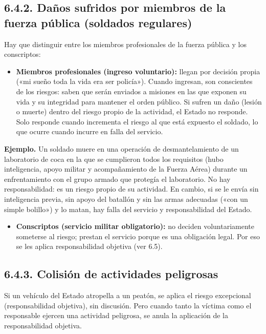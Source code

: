 \subsection{6.4.2. Daños sufridos por miembros de la fuerza pública (soldados regulares)}
Hay que distinguir entre los miembros profesionales de la fuerza pública y los conscriptos:

\begin{itemize}
\item \textbf{Miembros profesionales (ingreso voluntario):} llegan por decisión propia («mi sueño toda la vida era ser policía»). Cuando ingresan, son conscientes de los riesgos: saben que serán enviados a misiones en las que exponen su vida y su integridad para mantener el orden público. Si sufren un daño (lesión o muerte) dentro del riesgo propio de la actividad, el Estado no responde. Solo responde cuando incrementa el riesgo al que está expuesto el soldado, lo que ocurre cuando incurre en falla del servicio.
\end{itemize}
\begin{ejemplo}
\textcolor[HTML]{4F6228}{\textbf{Ejemplo. }}Un soldado muere en una operación de desmantelamiento de un laboratorio de coca en la que se cumplieron todos los requisitos (hubo inteligencia, apoyo militar y acompañamiento de la Fuerza Aérea) durante un enfrentamiento con el grupo armado que protegía el laboratorio. No hay responsabilidad: es un riesgo propio de su actividad. En cambio, si se le envía sin inteligencia previa, sin apoyo del batallón y sin las armas adecuadas («con un simple bolillo») y lo matan, hay falla del servicio y responsabilidad del Estado.
\end{ejemplo}
\begin{itemize}
\item \textbf{Conscriptos (servicio militar obligatorio):} no deciden voluntariamente someterse al riesgo; prestan el servicio porque es una obligación legal. Por eso se les aplica responsabilidad objetiva (ver 6.5).
\end{itemize}
\subsection{6.4.3. Colisión de actividades peligrosas}
Si un vehículo del Estado atropella a un peatón, se aplica el riesgo excepcional (responsabilidad objetiva), sin discusión. Pero cuando tanto la víctima como el responsable ejercen una actividad peligrosa, se anula la aplicación de la responsabilidad objetiva.

